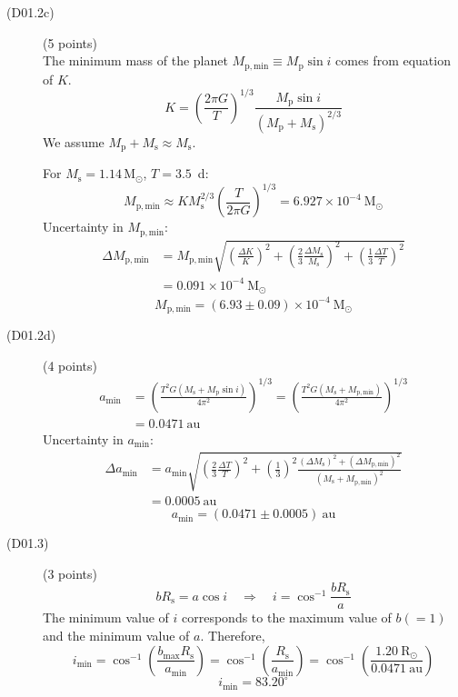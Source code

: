 \begin{description}
\item[(D01.2c)] \hfill(5 points)\\
The minimum mass of the planet
$M_{\mathrm{p,min}} \equiv M_{\mathrm{p}}\sin i$ comes from equation of $K$.
\[ K = \left(\frac{2\pi G}{T}\right)^{1/3}
   \frac{M_{\mathrm{p}}\sin i}{(M_{\mathrm{p}}+M_{\mathrm{s}})^{2/3}} \]
We assume $M_{\mathrm{p}} + M_{\mathrm{s}} \approx M_{\mathrm{s}}$.

For $M_{\mathrm{s}} = 1.14\,\mathrm{M_\odot}$, $T = 3.5$~d:
\[ M_{\mathrm{p,min}} \approx K M_{\mathrm{s}}^{2/3}
   \left(\frac{T}{2\pi G}\right)^{1/3}
   = 6.927\times10^{-4}\ \mathrm{M_\odot} \]
Uncertainty in $M_{\mathrm{p,min}}$:
\begin{align*}
\Delta M_{\mathrm{p,min}} &= M_{\mathrm{p,min}}
  \sqrt{\left(\frac{\Delta K}{K}\right)^2
  + \left(\frac{2}{3}\frac{\Delta M_{\mathrm{s}}}{M_{\mathrm{s}}}\right)^2
  + \left(\frac{1}{3}\frac{\Delta T}{T}\right)^2}\\
  &= 0.091\times10^{-4}\ \mathrm{M_\odot}
\end{align*}
\[ \boxed{M_{\mathrm{p,min}} = (6.93\pm0.09)\times10^{-4}\ \mathrm{M_\odot}} \]

\item[(D01.2d)] \hfill(4 points)
\begin{align*}
a_{\min} &= \left(\frac{T^2G(M_{\mathrm{s}}+M_{\mathrm{p}}\sin i)}{4\pi^2}\right)^{1/3}
  = \left(\frac{T^2G(M_{\mathrm{s}}+M_{\mathrm{p,min}})}{4\pi^2}\right)^{1/3}\\
  &= 0.0471\ \mathrm{au}
\end{align*}
Uncertainty in $a_{\min}$:
\begin{align*}
\Delta a_{\min} &= a_{\min}\sqrt{\left(\frac{2}{3}\frac{\Delta T}{T}\right)^2
  + \left(\frac{1}{3}\right)^2\frac{(\Delta M_{\mathrm{s}})^2
    + (\Delta M_{\mathrm{p,min}})^2}{(M_{\mathrm{s}}+M_{\mathrm{p,min}})^2}}\\
  &= 0.0005\ \mathrm{au}
\end{align*}
\[ \boxed{a_{\min} = (0.0471\pm0.0005)\ \mathrm{au}} \]

\item[(D01.3)] \hfill(3 points)
\[ bR_{\mathrm{s}} = a\cos i \quad\Longrightarrow\quad
   i = \cos^{-1}\frac{bR_{\mathrm{s}}}{a} \]
The minimum value of $i$ corresponds to the maximum value of $b(=1)$ and the
minimum value of $a$. Therefore,
\[ i_{\min} = \cos^{-1}\!\left(\frac{b_{\max}R_{\mathrm{s}}}{a_{\min}}\right)
   = \cos^{-1}\!\left(\frac{R_{\mathrm{s}}}{a_{\min}}\right)
   = \cos^{-1}\!\left(\frac{1.20\ \mathrm{R_\odot}}{0.0471\ \mathrm{au}}\right) \]
\[ \boxed{i_{\min} = 83.20^\circ} \]


\end{description}
